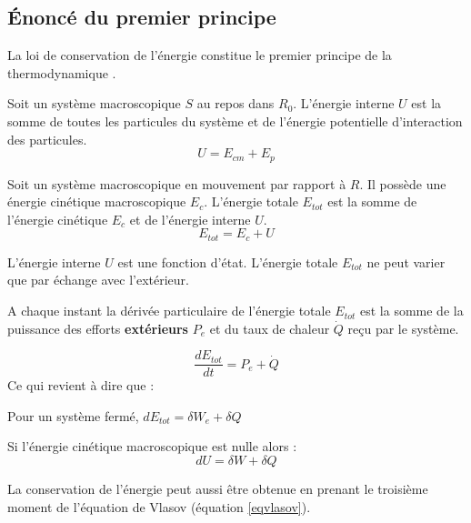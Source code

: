 \documentclass[12pt]{book}
\begin{document}
\subsection{\'Enonc\'e du premier principe}
La loi de conservation de l'\'energie constitue le premier principe de la
thermodynamique
\cite{ph:fluid:Germain80,ph:fluid:Truesdell66,ph:elect:Fournet,ph:elect:Petit89}.

\begin{defn}
Soit un syst\`eme macroscopique $S$ au repos dans $R_0$. L'\'energie
interne $U$ est la somme de toutes les particules du syst\`eme et de
l'\'energie potentielle d'interaction des particules.
\begin{equation}
U=E_{cm}+E_p
\end{equation}
\end{defn}
\begin{defn}
Soit un syst\`eme macroscopique en mouvement par rapport \`a $R$. Il
poss\`ede une \'energie cin\'etique macroscopique $E_c$.
L'\'energie totale $E_{tot}$ est la somme de l'\'energie cin\'etique
$E_c$ et de 
l'\'energie interne $U$.
\begin{equation}
E_{tot}=E_c+U
\end{equation}
\end{defn}
\begin{prin}
L'\'energie interne $U$ est une fonction d'\'etat. L'\'energie totale 
$E_{tot}$ ne
peut varier que par \'echange avec l'ext\'erieur.
\end{prin}
\begin{prin}
A chaque instant la d\'eriv\'ee particulaire de l'\'energie totale
$E_{tot}$ est la
somme de la puissance des efforts {\bf ext\'erieurs} $P_e$ et du taux de
chaleur $\dot Q$ re\c cu par le syst\`eme.
\end{prin}
\begin{equation}
\frac{dE_{tot}}{dt}=P_e+\dot Q
\end{equation}
Ce qui revient \`a dire que :
\begin{thm}
Pour un  syst\`eme ferm\'e, $dE_{tot}=\delta W_{e}+\delta Q$
\end{thm}
\begin{thm}
Si l'\'energie cin\'etique macroscopique est nulle alors :
\begin{equation}
dU=\delta W+\delta Q
\end{equation}
\end{thm}
\begin{rem}
La conservation de l'\'energie peut aussi \^etre  obtenue en prenant
le troisi\`eme 
moment de l'\'equation de Vlasov (\'equation \ref{eqvlasov}).
\end{rem}
\end{document}
